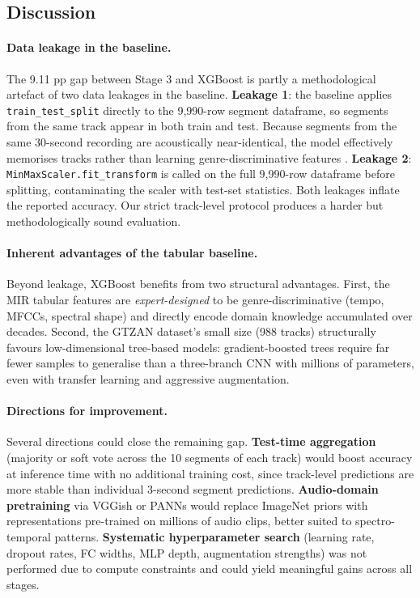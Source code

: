 \documentclass[10pt, twocolumn, a4paper]{article}
\begin{document}
\subsection{Discussion}

\paragraph{Data leakage in the baseline.}
The 9.11 pp gap between Stage 3 and XGBoost is partly a methodological artefact of two data leakages in the baseline. \textbf{Leakage 1}: the baseline applies \texttt{train\_test\_split} directly to the 9,990-row segment dataframe, so segments from the same track appear in both train and test. Because segments from the same 30-second recording are acoustically near-identical, the model effectively memorises tracks rather than learning genre-discriminative features \cite{sturm2013}. \textbf{Leakage 2}: \texttt{MinMaxScaler.fit\_transform} is called on the full 9,990-row dataframe before splitting, contaminating the scaler with test-set statistics. Both leakages inflate the reported accuracy. Our strict track-level protocol produces a harder but methodologically sound evaluation.

\paragraph{Inherent advantages of the tabular baseline.}
Beyond leakage, XGBoost benefits from two structural advantages. First, the MIR tabular features are \textit{expert-designed} to be genre-discriminative (tempo, MFCCs, spectral shape) and directly encode domain knowledge accumulated over decades. Second, the GTZAN dataset's small size (988 tracks) structurally favours low-dimensional tree-based models: gradient-boosted trees require far fewer samples to generalise than a three-branch CNN with millions of parameters, even with transfer learning and aggressive augmentation.

\paragraph{Directions for improvement.}
Several directions could close the remaining gap. \textbf{Test-time aggregation} (majority or soft vote across the 10 segments of each track) would boost accuracy at inference time with no additional training cost, since track-level predictions are more stable than individual 3-second segment predictions. \textbf{Audio-domain pretraining} via VGGish \cite{hershey2017} or PANNs \cite{kong2020} would replace ImageNet priors with representations pre-trained on millions of audio clips, better suited to spectro-temporal patterns. \textbf{Systematic hyperparameter search} (learning rate, dropout rates, FC widths, MLP depth, augmentation strengths) was not performed due to compute constraints and could yield meaningful gains across all stages.
\end{document}
